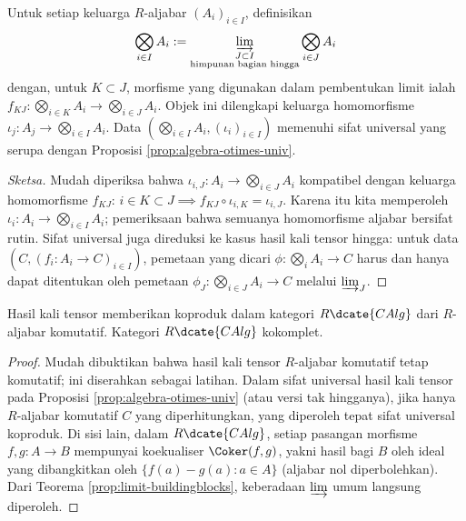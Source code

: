 \begin{definition-theorem}\label{def:inf-tensor-product}
	Untuk setiap keluarga $R$-aljabar $(A_i)_{i \in I}$, definisikan
	\[ \bigotimes_{i \in I} A_i := \varinjlim_{\substack{J \subset I \\ \text{himpunan bagian hingga}}} \bigotimes_{i \in J} A_i \]
	dengan, untuk $K \subset J$, morfisme yang digunakan dalam pembentukan limit ialah $f_{KJ}: \bigotimes_{i \in K} A_i \to \bigotimes_{i \in J} A_i$. Objek ini dilengkapi keluarga homomorfisme $\iota_j: A_j \to \bigotimes_{i \in I} A_i$. Data $(\bigotimes_{i \in I} A_i, (\iota_i)_{i \in I})$ memenuhi sifat universal yang serupa dengan Proposisi \ref{prop:algebra-otimes-univ}.
\end{definition-theorem}
\begin{proof}[Sketsa]
	Mudah diperiksa bahwa $\iota_{i,J}: A_i \to \bigotimes_{i \in J} A_i$ kompatibel dengan keluarga homomorfisme $f_{KJ}$: $i \in K \subset J \implies f_{KJ} \circ \iota_{i,K} = \iota_{i,J}$. Karena itu kita memperoleh $\iota_i: A_i \to \bigotimes_{i \in I} A_i$; pemeriksaan bahwa semuanya homomorfisme aljabar bersifat rutin. Sifat universal juga direduksi ke kasus hasil kali tensor hingga: untuk data $(C, (f_i: A_i \to C)_{i \in I})$, pemetaan yang dicari $\phi: \bigotimes_i A_i \to C$ harus dan hanya dapat ditentukan oleh pemetaan $\phi_J: \bigotimes_{i \in J} A_i \to C$ melalui $\varinjlim_J$.
\end{proof}

\begin{corollary}\label{prop:tensor-alg-cocomplete}
	Hasil kali tensor memberikan koproduk dalam kategori $R\dcate{CAlg}$ dari $R$-aljabar komutatif. Kategori $R\dcate{CAlg}$ kokomplet.
\end{corollary}
\begin{proof}
	Mudah dibuktikan bahwa hasil kali tensor $R$-aljabar komutatif tetap komutatif; ini diserahkan sebagai latihan. Dalam sifat universal hasil kali tensor pada Proposisi \ref{prop:algebra-otimes-univ} (atau versi tak hingganya), jika hanya $R$-aljabar komutatif $C$ yang diperhitungkan, yang diperoleh tepat sifat universal koproduk. Di sisi lain, dalam $R\dcate{CAlg}$, setiap pasangan morfisme $f, g: A \to B$ mempunyai koekualiser $\Coker(f,g)$, yakni hasil bagi $B$ oleh ideal yang dibangkitkan oleh $\{f(a)-g(a): a \in A \}$ (aljabar nol diperbolehkan). Dari Teorema \ref{prop:limit-buildingblocks}, keberadaan $\varinjlim$ umum langsung diperoleh.
\end{proof}

